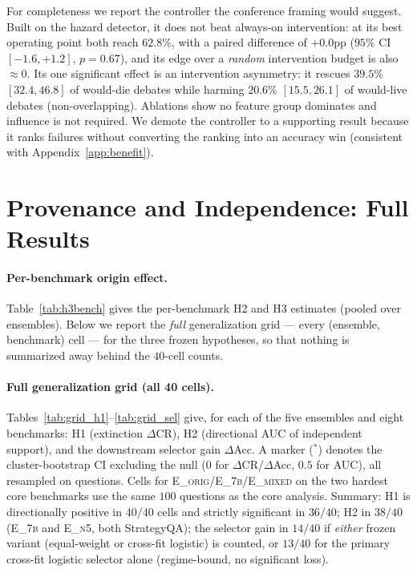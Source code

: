 For completeness we report the controller the conference framing would suggest. Built on the hazard
detector, it does not beat always-on intervention: at its best operating point both reach $62.8\%$, with a
paired difference of $+0.0$pp ($95\%$ CI $[-1.6,+1.2]$, $p=0.67$), and its edge over a \emph{random}
intervention budget is also $\approx 0$. Its one significant effect is an intervention asymmetry: it rescues
$39.5\%$ $[32.4,46.8]$ of would-die debates while harming $20.6\%$ $[15.5,26.1]$ of would-live debates
(non-overlapping). Ablations show no feature group dominates and influence is not required. We demote the
controller to a supporting result because it ranks failures without converting the ranking into an accuracy
win (consistent with Appendix~\ref{app:benefit}).

\section{Provenance and Independence: Full Results}
\label{app:e26}

\paragraph{Per-benchmark origin effect.}
Table~\ref{tab:h3bench} gives the per-benchmark H2 and H3 estimates (pooled over ensembles).
Below we report the \emph{full} generalization grid --- every (ensemble, benchmark) cell --- for the three
frozen hypotheses, so that nothing is summarized away behind the $40$-cell counts.

\paragraph{Full generalization grid (all 40 cells).}
Tables~\ref{tab:grid_h1}--\ref{tab:grid_sel} give, for each of the five ensembles and eight benchmarks:
H1 (extinction $\Delta\mathrm{CR}$), H2 (directional AUC of independent support), and the downstream selector
gain $\Delta$Acc. A marker ($^{*}$) denotes the cluster-bootstrap CI excluding the null ($0$ for
$\Delta\mathrm{CR}$/$\Delta$Acc, $0.5$ for AUC), all resampled on questions. Cells for
\textsc{E\_orig}/\textsc{E\_7b}/\textsc{E\_mixed} on the two hardest core benchmarks use the same $100$
questions as the core analysis. Summary: H1 is directionally positive in $40/40$ cells and strictly
significant in $36/40$; H2 in $38/40$ (\textsc{E\_7b} and \textsc{E\_n5}, both StrategyQA); the selector gain in $14/40$ if
\emph{either} frozen variant (equal-weight or cross-fit logistic) is counted, or $13/40$ for the primary
cross-fit logistic selector alone (regime-bound, no significant loss).

